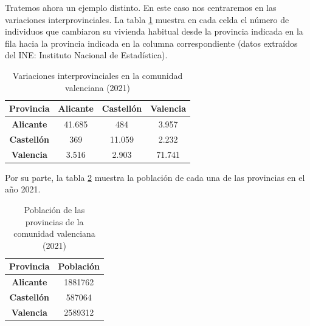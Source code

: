 \begin{ejemplo}\label{ej:cv}
    Tratemos ahora un ejemplo distinto. En este caso nos centraremos en las variaciones interprovinciales. La tabla \ref{tab:variaciones} muestra en cada celda el número de individuos que cambiaron su vivienda habitual desde la provincia indicada en la fila hacia la provincia indicada en la columna correspondiente (datos extraídos del INE: Instituto Nacional de Estadística).

    \begin{table}[h]
        \centering
        \begin{tabular}{cccc}\hline
            \textbf{Provincia} & \textbf{Alicante} & \textbf{Castellón} & \textbf{Valencia} \\ \hline\hline
        \textbf{Alicante}                  & 41.685                    & 484                         & 3.957                      \\ \hline
        \textbf{Castellón}                & 369                       & 11.059                      & 2.232                      \\ \hline
        \textbf{Valencia}                & 3.516                     & 2.903                       & 71.741 \\ \hline            
        \end{tabular}
        \caption{Variaciones interprovinciales en la comunidad valenciana (2021)}
        \label{tab:variaciones}
        \end{table}


        Por su parte, la tabla \ref{tab:poblacion} muestra la población de cada una de las provincias en el año 2021. 

        \begin{table}[h]
            \centering
            \begin{tabular}{cc}\hline
                \textbf{Provincia}  & \textbf{Población} \\ \hline\hline
                \textbf{Alicante} &  1881762 \\ \hline
                \textbf{Castellón} & 587064 \\ \hline
                \textbf{Valencia} & 2589312 \\ \hline
            \end{tabular}
            \caption{Población de las provincias de la comunidad valenciana (2021)}
            \label{tab:poblacion}
        \end{table}


\end{ejemplo}

